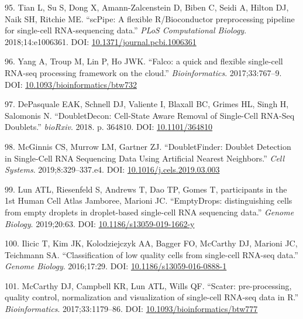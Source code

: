 \documentclass[11pt,a4paper,titlepage,twoside,openright]{style/unimelbthesis}
\theoremstyle{definition}
\theoremstyle{definition}
\theoremstyle{definition}
\theoremstyle{remark}
\begin{document}
\begin{mainmatter}
\leavevmode\hypertarget{ref-Tian2018-ub}{}%
95. Tian L, Su S, Dong X, Amann-Zalcenstein D, Biben C, Seidi A, Hilton DJ, Naik SH, Ritchie ME. ``scPipe: A flexible R/Bioconductor preprocessing pipeline for single-cell RNA-sequencing data.'' \emph{PLoS Computational Biology}. 2018;14:e1006361. DOI: \href{https://doi.org/10.1371/journal.pcbi.1006361}{10.1371/journal.pcbi.1006361}

\leavevmode\hypertarget{ref-Yang2017-yz}{}%
96. Yang A, Troup M, Lin P, Ho JWK. ``Falco: a quick and flexible single-cell RNA-seq processing framework on the cloud.'' \emph{Bioinformatics}. 2017;33:767--9. DOI: \href{https://doi.org/10.1093/bioinformatics/btw732}{10.1093/bioinformatics/btw732}

\leavevmode\hypertarget{ref-DePasquale2018-ct}{}%
97. DePasquale EAK, Schnell DJ, Valiente I, Blaxall BC, Grimes HL, Singh H, Salomonis N. ``DoubletDecon: Cell-State Aware Removal of Single-Cell RNA-Seq Doublets.'' \emph{bioRxiv}. 2018. p. 364810. DOI: \href{https://doi.org/10.1101/364810}{10.1101/364810}

\leavevmode\hypertarget{ref-McGinnis2019-at}{}%
98. McGinnis CS, Murrow LM, Gartner ZJ. ``DoubletFinder: Doublet Detection in Single-Cell RNA Sequencing Data Using Artificial Nearest Neighbors.'' \emph{Cell Systems}. 2019;8:329--337.e4. DOI: \href{https://doi.org/10.1016/j.cels.2019.03.003}{10.1016/j.cels.2019.03.003}

\leavevmode\hypertarget{ref-Lun2019-wp}{}%
99. Lun ATL, Riesenfeld S, Andrews T, Dao TP, Gomes T, participants in the 1st Human Cell Atlas Jamboree, Marioni JC. ``EmptyDrops: distinguishing cells from empty droplets in droplet-based single-cell RNA sequencing data.'' \emph{Genome Biology}. 2019;20:63. DOI: \href{https://doi.org/10.1186/s13059-019-1662-y}{10.1186/s13059-019-1662-y}

\leavevmode\hypertarget{ref-Ilicic2016-wy}{}%
100. Ilicic T, Kim JK, Kolodziejczyk AA, Bagger FO, McCarthy DJ, Marioni JC, Teichmann SA. ``Classification of low quality cells from single-cell RNA-seq data.'' \emph{Genome Biology}. 2016;17:29. DOI: \href{https://doi.org/10.1186/s13059-016-0888-1}{10.1186/s13059-016-0888-1}

\leavevmode\hypertarget{ref-McCarthy2017-ql}{}%
101. McCarthy DJ, Campbell KR, Lun ATL, Wills QF. ``Scater: pre-processing, quality control, normalization and visualization of single-cell RNA-seq data in R.'' \emph{Bioinformatics}. 2017;33:1179--86. DOI: \href{https://doi.org/10.1093/bioinformatics/btw777}{10.1093/bioinformatics/btw777}


\end{mainmatter}
\end{document}
